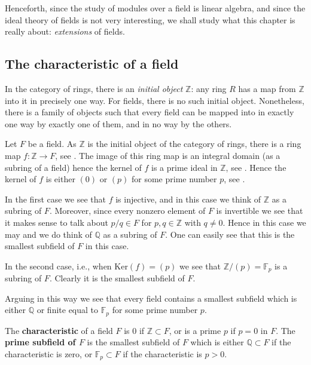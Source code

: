 Henceforth, since the study of modules over a field is linear algebra, and
since the ideal theory of fields is not very interesting, we shall study what
this chapter is really about: \emph{extensions} of fields.

\subsection{The characteristic of a field}
\label{more-fields}

In the category of rings, there is an \emph{initial object} $\mathbb{Z}$: any
ring $R$ has a map from $\mathbb{Z}$ into it in precisely one way. For fields,
there is no such initial object.
Nonetheless, there is a family of objects such that every field can be mapped
into in exactly one way by exactly one of them, and in no way by the others.

Let $F$ be a field. As $\mathbb{Z}$ is the initial object of the category of
rings, there is a ring map $f : \mathbb{Z} \to F$, see
.
The image of this ring map is an integral domain (as a subring of a field)
hence the kernel of $f$ is a prime ideal in $\mathbb{Z}$, see
.
Hence the kernel of $f$ is either $(0)$ or $(p)$ for some prime number $p$, see
.

In the first case we see that $f$ is injective, and in this case
we think of $\mathbb{Z}$ as a subring of $F$. Moreover, since every
nonzero element of $F$ is invertible we see that it makes sense to
talk about $p/q \in F$ for $p, q \in \mathbb{Z}$ with $q \not = 0$.
Hence in this case we may and we do think of $\mathbb{Q}$ as a subring of $F$.
One can easily see that this is the smallest subfield of $F$ in this case.

In the second case, i.e., when $\text{Ker}(f) = (p)$ we see that
$\mathbb{Z}/(p) = \mathbb{F}_p$ is a subring of $F$.  Clearly it is the smallest subfield of $F$.

Arguing in this way we see that every field contains a smallest subfield
which is either $\mathbb{Q}$ or finite equal to $\mathbb{F}_p$ for some
prime number $p$.

\begin{definition}
The \textbf{characteristic} of a field $F$ is $0$ if
$\mathbb{Z} \subset F$, or is a prime $p$ if $p = 0$ in $F$.
The \textbf{prime subfield of $F$} is the smallest subfield of $F$
which is either $\mathbb{Q} \subset F$ if the characteristic is zero, or
$\mathbb{F}_p \subset F$ if the characteristic is $p > 0$.
\end{definition}


